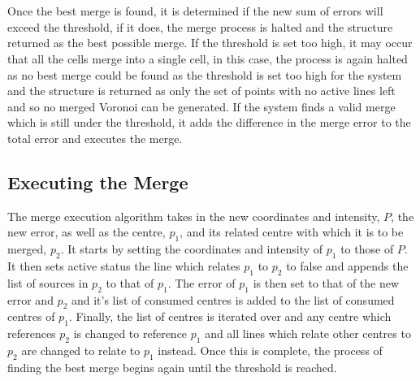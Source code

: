\\
\\
Once the best merge is found, it is determined if the new sum of errors will exceed the threshold, if it does, the merge process is halted and the structure returned as the best possible merge. If the threshold is set too high, it may occur that all the cells merge into a single cell, in this case, the process is again halted as no best merge could be found as the threshold is set too high for the system and the structure is returned as only the set of points with no active lines left and so no merged Voronoi can be generated. If the system finds a valid merge which is still under the threshold, it adds the difference in the merge error to the total error and executes the merge.

\subsection{Executing the Merge}
The merge execution algorithm takes in the new coordinates and intensity, $P$, the new error, as well as the centre, $p_1$, and its related centre with which it is to be merged, $p_2$. It starts by setting the coordinates and intensity of $p_1$ to those of $P$. It then sets active status the line which relates $p_1$ to $p_2$ to false and appends the list of sources in $p_2$ to that of $p_1$. The error of $p_1$ is then set to that of the new error and $p_2$ and it's list of consumed centres is added to the list of consumed centres of $p_1$. Finally, the list of centres is iterated over and any centre which references $p_2$ is changed to reference $p_1$ and all lines which relate other centres to $p_2$ are changed to relate to $p_1$ instead. Once this is complete, the process of finding the best merge begins again until the threshold is reached.
